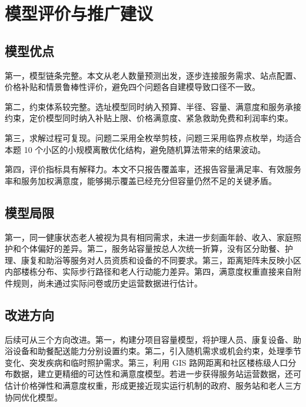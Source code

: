 \section{模型评价与推广建议}

\subsection{模型优点}

第一，模型链条完整。本文从老人数量预测出发，逐步连接服务需求、站点配置、价格补贴和情景鲁棒性评价，避免四个问题各自建模导致口径不一致。

第二，约束体系较完整。选址模型同时纳入预算、半径、容量、满意度和服务承接约束，定价模型同时纳入补贴上限、价格满意度、紧急救助免费和利润率约束。

第三，求解过程可复现。问题二采用全枚举剪枝，问题三采用临界点枚举，均适合本题 10 个小区的小规模离散优化结构，避免随机算法带来的结果波动。

第四，评价指标具有解释力。本文不只报告覆盖率，还报告容量满足率、有效服务率和服务加权满意度，能够揭示覆盖已经充分但容量仍然不足的关键矛盾。

\subsection{模型局限}

第一，同一健康状态老人被视为具有相同需求，未进一步刻画年龄、收入、家庭照护和个体偏好的差异。第二，服务站容量按总人次统一折算，没有区分助餐、护理、康复和助浴等服务对人员资质和设备的不同要求。第三，距离矩阵未反映小区内部楼栋分布、实际步行路径和老人行动能力差异。第四，满意度权重直接来自附件规则，尚未通过实际问卷或历史运营数据进行估计。

\subsection{改进方向}

后续可从三个方向改进。第一，构建分项目容量模型，将护理人员、康复设备、助浴设备和助餐配送能力分别设置约束。第二，引入随机需求或机会约束，处理季节变化、突发疾病和临时照护需求。第三，利用 GIS 路网距离和社区楼栋级人口分布数据，建立更精细的可达性和满意度模型。若进一步获得服务站运营数据，还可估计价格弹性和满意度权重，形成更接近现实运行机制的政府、服务站和老人三方协同优化模型。
